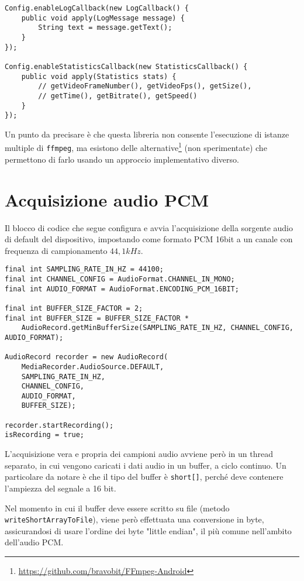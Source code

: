 \begin{verbatim}
Config.enableLogCallback(new LogCallback() {
    public void apply(LogMessage message) {
        String text = message.getText();
    }
});

Config.enableStatisticsCallback(new StatisticsCallback() {
    public void apply(Statistics stats) {
        // getVideoFrameNumber(), getVideoFps(), getSize(),
        // getTime(), getBitrate(), getSpeed()
    }
});
\end{verbatim}

Un punto da precisare è che questa libreria non consente l'esecuzione di istanze multiple di \texttt{ffmpeg}, ma esistono delle alternative\footnote{\url{https://github.com/bravobit/FFmpeg-Android}} (non sperimentate) che permettono di farlo usando un approccio implementativo diverso.

\chapter{Acquisizione audio PCM}
\label{cha:allegato_pcm}

Il blocco di codice che segue configura e avvia l'acquisizione della sorgente audio di default del dispositivo, impostando come formato PCM 16bit a un canale con frequenza di campionamento $44,1 kHz$.

\begin{verbatim}
final int SAMPLING_RATE_IN_HZ = 44100;
final int CHANNEL_CONFIG = AudioFormat.CHANNEL_IN_MONO;
final int AUDIO_FORMAT = AudioFormat.ENCODING_PCM_16BIT;

final int BUFFER_SIZE_FACTOR = 2;
final int BUFFER_SIZE = BUFFER_SIZE_FACTOR *
    AudioRecord.getMinBufferSize(SAMPLING_RATE_IN_HZ, CHANNEL_CONFIG, AUDIO_FORMAT);

AudioRecord recorder = new AudioRecord(
    MediaRecorder.AudioSource.DEFAULT,
    SAMPLING_RATE_IN_HZ,
    CHANNEL_CONFIG,
    AUDIO_FORMAT,
    BUFFER_SIZE);

recorder.startRecording();
isRecording = true;
\end{verbatim}

L'acquisizione vera e propria dei campioni audio avviene però in un thread separato, in cui vengono caricati i dati audio in un buffer, a ciclo continuo. Un particolare da notare è che il tipo del buffer è \texttt{short[]}, perché deve contenere l'ampiezza del segnale a 16 bit.

Nel momento in cui il buffer deve essere scritto su file (metodo \texttt{writeShortArrayToFile}), viene però effettuata una conversione in byte, assicurandosi di usare l'ordine dei byte "little endian", il più comune nell'ambito dell'audio PCM.

